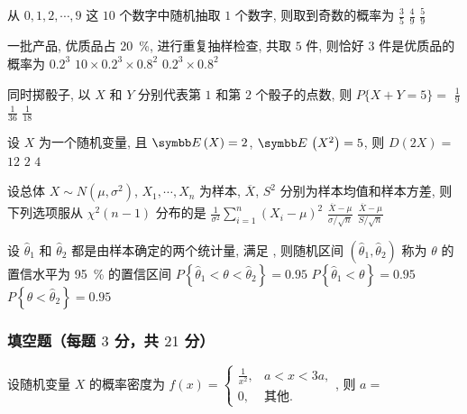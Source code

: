 \begin{ti}
	从 $0,1,2,\cdots,9$ 这 $10$ 个数字中随机抽取 $1$ 个数字, 则取到奇数的概率为 \kuo{}
	{$\frac{3}{5}$}
	{$\frac{4}{9}$}
	{$\frac{5}{9}$}
\end{ti}

\begin{ti}
	一批产品, 优质品占 \SI{20}{\percent}, 进行重复抽样检查, 共取 $5$ 件, 则恰好 $3$ 件是优质品的概率为 \kuo{}
	{$0.2^3$}
	{$10\times 0.2^3\times 0.8^2$}
	{$0.2^3\times 0.8^2$}
\end{ti}

\begin{ti}
	同时掷骰子, 以 $X$ 和 $Y$ 分别代表第 $1$ 和第 $2$ 个骰子的点数, 则 $P\{ X+Y=5 \}=$ \kuo{}
	{$\frac{1}{9}$}
	{$\frac{1}{36}$}
	{$\frac{1}{18}$}
\end{ti}

\begin{ti}
	设 $X$ 为一个随机变量, 且 $\EE(X)=2$, $\EE\left( X^2 \right)=5$, 则 $D(2X)=$ \kuo{}
	{$12$}
	{$2$}
	{$4$}
\end{ti}

\begin{ti}
	设总体 $X\sim N\left( \mu,\sigma^2 \right)$, $X_1,\cdots,X_n$ 为样本, $\overline{X}$, $S^2$ 分别为样本均值和样本方差, 则下列选项服从 $\chi^2(n-1)$ 分布的是 \kuo{}
	{$\frac{1}{\sigma^2}\sum_{i=1}^n \left(X_i-\mu\right)^2$}
	{$\frac{\overline{X}-\mu}{\sigma/\sqrt{n}}$}
	{$\frac{\overline{X}-\mu}{S/\sqrt{n}}$}
\end{ti}

\begin{ti}
	设 $\hat{\theta}_1$ 和 $\hat{\theta}_2$ 都是由样本确定的两个统计量, 满足 \kuo{}, 则随机区间 $\left(\hat{\theta}_1,\hat{\theta}_2\right)$ 称为 $\theta$ 的置信水平为 \SI{95}{\percent} 的置信区间
	{$P\left\{ \hat{\theta}_1<\theta<\hat{\theta}_2 \right\}=0.95$}
	{$P\left\{ \hat{\theta}_1<\theta \right\}=0.95$}
	{$P\left\{ \theta<\hat{\theta}_2 \right\}=0.95$}
\end{ti}

\subsubsection{填空题（每题 $3$ 分，共 $21$ 分）}
\begin{ti}
	设随机变量 $X$ 的概率密度为 $f(x)=
	\begin{cases}
		\frac{1}{x^2}, & a<x<3a,\\
		0, & \text{其他}.
	\end{cases}$, 则 $a=$\hua{}
\end{ti}

